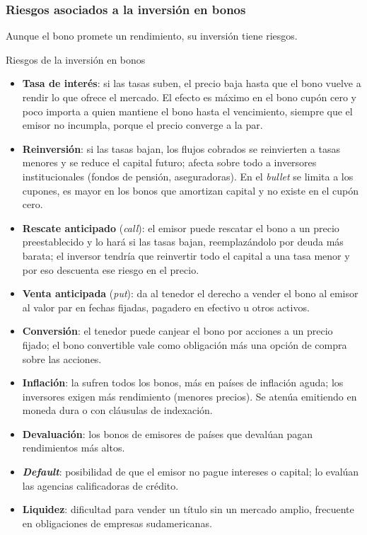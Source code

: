 \subsubsection{Riesgos asociados a la inversión en bonos}

Aunque el bono promete un rendimiento, su inversión tiene riesgos.

\begin{definicion}{Riesgos de la inversión en bonos}
\begin{itemize}
\item \textbf{Tasa de interés}: si las tasas suben, el precio baja hasta que el bono vuelve a rendir lo que ofrece el mercado. El efecto es máximo en el bono cupón cero y poco importa a quien mantiene el bono hasta el vencimiento, siempre que el emisor no incumpla, porque el precio converge a la par.
\item \textbf{Reinversión}: si las tasas bajan, los flujos cobrados se reinvierten a tasas menores y se reduce el capital futuro; afecta sobre todo a inversores institucionales (fondos de pensión, aseguradoras). En el \emph{bullet} se limita a los cupones, es mayor en los bonos que amortizan capital y no existe en el cupón cero.
\item \textbf{Rescate anticipado} (\emph{call}): el emisor puede rescatar el bono a un precio preestablecido y lo hará si las tasas bajan, reemplazándolo por deuda más barata; el inversor tendría que reinvertir todo el capital a una tasa menor y por eso descuenta ese riesgo en el precio.
\item \textbf{Venta anticipada} (\emph{put}): da al tenedor el derecho a vender el bono al emisor al valor par en fechas fijadas, pagadero en efectivo u otros activos.
\item \textbf{Conversión}: el tenedor puede canjear el bono por acciones a un precio fijado; el bono convertible vale como obligación más una opción de compra sobre las acciones.
\item \textbf{Inflación}: la sufren todos los bonos, más en países de inflación aguda; los inversores exigen más rendimiento (menores precios). Se atenúa emitiendo en moneda dura o con cláusulas de indexación.
\item \textbf{Devaluación}: los bonos de emisores de países que devalúan pagan rendimientos más altos.
\item \textbf{\emph{Default}}: posibilidad de que el emisor no pague intereses o capital; lo evalúan las agencias calificadoras de crédito.
\item \textbf{Liquidez}: dificultad para vender un título sin un mercado amplio, frecuente en obligaciones de empresas sudamericanas.
\end{itemize}
\end{definicion}

